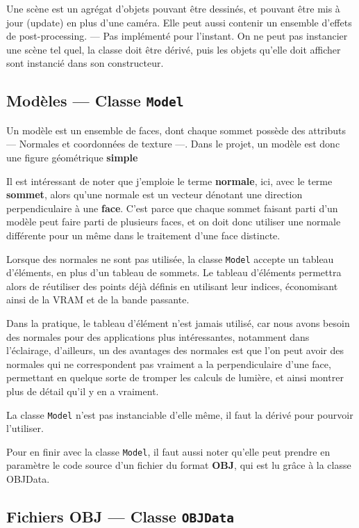 \documentclass[pdftex, 11pt, a4paper, titlepage]{article}
\begin{document}
Une scène est un agrégat d'objets pouvant être dessinés, et pouvant
être mis à jour (update) en plus d'une caméra.  Elle peut aussi
contenir un ensemble d'effets de post-processing. --- Pas implémenté
pour l'instant.  On ne peut pas instancier une scène tel quel, la
classe doit être dérivé, puis les objets qu'elle doit afficher sont
instancié dans son constructeur.

\subsection{Modèles --- Classe \texttt{Model}}

Un modèle est un ensemble de faces, dont chaque sommet possède des
attributs --- Normales et coordonnées de texture ---.  Dans le projet,
un modèle est donc une figure géométrique \textbf{simple}

Il est intéressant de noter que j'emploie le terme \textbf{normale},
ici, avec le terme \textbf{sommet}, alors qu'une normale est un
vecteur dénotant une direction perpendiculaire à une
\textbf{face}. C'est parce que chaque sommet faisant parti d'un modèle
peut faire parti de plusieurs faces, et on doit donc utiliser une
normale différente pour un même dans le traitement d'une face
distincte.

Lorsque des normales ne sont pas utilisée, la classe \texttt{Model}
accepte un tableau d'éléments, en plus d'un tableau de sommets. Le
tableau d'éléments permettra alors de réutiliser des points déjà
définis en utilisant leur indices, économisant ainsi de la VRAM et de
la bande passante.

Dans la pratique, le tableau d'élément n'est jamais utilisé, car nous
avons besoin des normales pour des applications plus intéressantes,
notamment dans l'éclairage, d'ailleurs, un des avantages des normales
est que l'on peut avoir des normales qui ne correspondent pas vraiment
a la perpendiculaire d'une face, permettant en quelque sorte de
tromper les calculs de lumière, et ainsi montrer plus de détail qu'il
y en a vraiment.

La classe \texttt{Model} n'est pas instanciable d'elle même, il faut
la dérivé pour pourvoir l'utiliser.

Pour en finir avec la classe \texttt{Model}, il faut aussi noter
qu'elle peut prendre en paramètre le code source d'un fichier du
format \textbf{OBJ}, qui est lu grâce à la classe OBJData.

\pagebreak
\subsection{Fichiers OBJ --- Classe \texttt{OBJData}}
\end{document}
